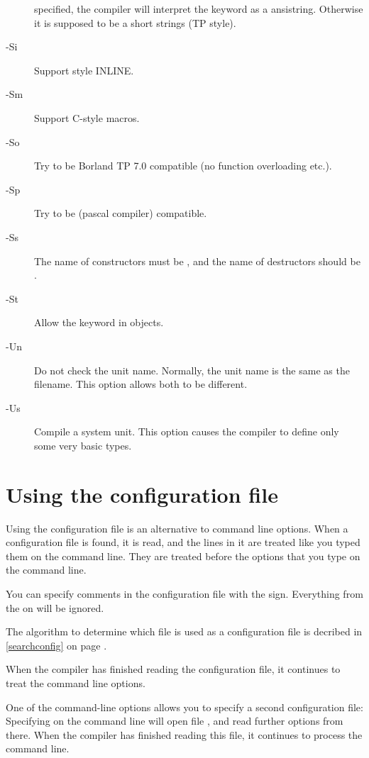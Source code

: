 \begin{description}
specified, the compiler will interpret the  keyword as a
ansistring. Otherwise it is supposed to be a short strings (TP style).
\item [-Si]  Support  style INLINE.
\item [-Sm]  Support C-style macros.
\item [-So]  Try to be Borland TP 7.0 compatible (no function
overloading etc.).
\item [-Sp]  Try to be  (\gnu pascal compiler)
compatible.
\item [-Ss]  The name of constructors must be , and the
name of destructors should be .
\item [-St]  Allow the  keyword in objects.
\item [-Un]  Do not check the unit name. Normally, the unit name
is the same as the filename. This option allows both to be different.
\item [-Us]  Compile a system unit. This option causes the
compiler to define only some very basic types.
\end{description}


\section{Using the configuration file}
\label{se:configfile}
Using the configuration file  is an alternative to command
line options. When a configuration file is found, it is read, and the lines
in it are treated like you typed them on the command line. They are treated
before the options that you type on the command line.

You can specify comments in the configuration file with the \var{\#} sign.
Everything from the \var{\#} on will be ignored.

The algorithm to determine which file is used as a configuration file
is decribed in \ref{searchconfig} on page \pageref{searchconfig}.

When the compiler has finished reading the configuration file, it continues
to treat the command line options.

One of the command-line options allows you to specify a second configuration
file: Specifying  on the command line will open file ,
and read further options from there. When the compiler has finished reading
this file, it continues to process the command line.

